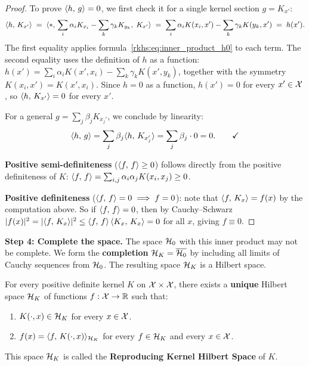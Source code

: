 \begin{notechapter}
\begin{proof}
To prove $\langle h,\, g \rangle = 0$, we first check it for
a single kernel section $g = K_{x'}$:
\[
\langle h,\, K_{x'} \rangle
\;=\; \langle *,\, \sum_i \alpha_i K_{x_i}
  - \sum_k \gamma_k K_{y_k},\; K_{x'} \rangle
\;=\; \sum_i \alpha_i K(x_i, x')
  - \sum_k \gamma_k K(y_k, x')
\;=\; h(x').
\]
The first equality applies
formula~\eqref{rkhs:eq:inner_product_h0} to each term.
The second equality uses the definition of $h$ as
a function: $h(x') = \sum_i \alpha_i K(x', x_i)
- \sum_k \gamma_k K(x', y_k)$, together with the
symmetry $K(x_i, x') = K(x', x_i)$. Since $h = 0$
as a function, $h(x') = 0$ for every $x' \in \mathcal{X}$,
so $\langle h,\, K_{x'} \rangle = 0$ for every $x'$.

For a general $g = \sum_j \beta_j K_{x_j'}$, we
conclude by linearity:
\[
\langle h,\, g \rangle
= \sum_j \beta_j \langle h,\, K_{x_j'} \rangle
= \sum_j \beta_j \cdot 0 = 0.
\qquad\checkmark
\]

\medskip
\textbf{Positive semi-definiteness}
($\langle f,\, f \rangle \geq 0$) follows directly from the
positive definiteness of $K$:
$\langle f,\, f \rangle = \sum_{i,j} \alpha_i \alpha_j
K(x_i, x_j) \geq 0$.

\medskip
\textbf{Positive definiteness}
($\langle f,\, f \rangle = 0 \implies f = 0$): note that
$\langle f,\, K_x \rangle = f(x)$ by the computation above.
So if $\langle f,\, f \rangle = 0$, then by Cauchy--Schwarz
$|f(x)|^2 = |\langle f,\, K_x \rangle|^2
\leq \langle f,\, f \rangle\,\langle K_x,\, K_x \rangle = 0$
for all $x$, giving $f \equiv 0$.
\end{proof}

\textbf{Step 4: Complete the space.} The space $\mathcal{H}_0$ with this inner
product may not be complete. We form the \textbf{completion} $\mathcal{H}_K =
\overline{\mathcal{H}_0}$ by including all limits of Cauchy sequences from
$\mathcal{H}_0$. The resulting space $\mathcal{H}_K$ is a Hilbert space.

\begin{theorembox}
\begin{theorem}
\label{rkhs:thm:moore_aronszajn}
For every positive definite kernel $K$ on $\mathcal{X} \times \mathcal{X}$, there exists a
\textbf{unique} Hilbert space $\mathcal{H}_K$ of functions $f: \mathcal{X} \to \mathbb{R}$ such
that:
\begin{enumerate}[label=(\roman*)]
  \item $K(\cdot, x) \in \mathcal{H}_K$ for every $x \in \mathcal{X}$.
  \item $f(x) = \langle f,\, K(\cdot, x) \rangle_{\mathcal{H}_K}$ for every $f \in \mathcal{H}_K$ and
  every $x \in \mathcal{X}$.
\end{enumerate}
This space $\mathcal{H}_K$ is called the \textbf{Reproducing Kernel Hilbert Space} of $K$.
\end{theorem}
\end{theorembox}


\end{notechapter}
